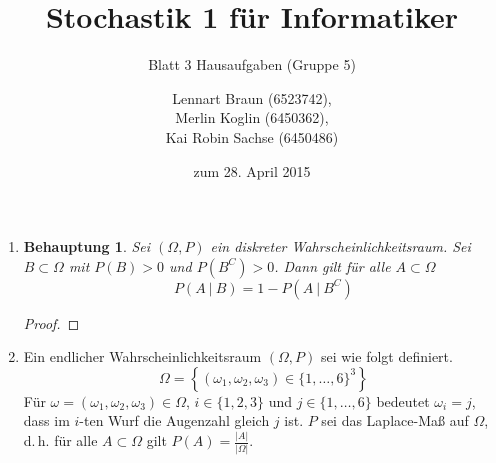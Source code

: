 \documentclass[a4paper]{scrartcl}
\title{Stochastik 1 für Informatiker}
\subtitle{Blatt 3 Hausaufgaben (Gruppe 5)}
\author{
    Lennart Braun (6523742), \\
    Merlin Koglin (6450362), \\
    Kai Robin Sachse (6450486)
}
\date{zum 28. April 2015}
\newtheorem*{behaupt}{Behauptung}
\begin{document}
\maketitle

\begin{enumerate}[label=\bfseries\arabic*.]
    \item
        \begin{behaupt}
            Sei $(\Omega, P)$ ein diskreter Wahrscheinlichkeitsraum.
            Sei $B \subset \Omega$ mit $P(B) > 0$ und $P(B^C) > 0$.
            Dann gilt für alle $A \subset \Omega$
            \begin{equation*}
                P(A\ |\ B) = 1 - P(A\ |\ B^C)
            \end{equation*}
        \end{behaupt}
        \begin{proof}
            
        \end{proof}

    \item
        Ein endlicher Wahrscheinlichkeitsraum $(\Omega, P)$ sei wie folgt
        definiert.
        \begin{equation*}
            \Omega = \left\{ (\omega_1, \omega_2, \omega_3)
                \in \{1, \ldots, 6\}^3 \right\}
        \end{equation*}
        Für $\omega = (\omega_1, \omega_2, \omega_3) \in \Omega$,
        $i \in \{1, 2, 3\}$ und $j \in \{1, \ldots, 6\}$ bedeutet
        $\omega_i = j$, dass im $i$-ten Wurf die Augenzahl gleich $j$ ist.
        $P$ sei das Laplace-Maß auf $\Omega$, d.\,h. für alle $A \subset \Omega$
        gilt $P(A) = \frac{|A|}{|\Omega|}$.


\end{enumerate}
\end{document}
